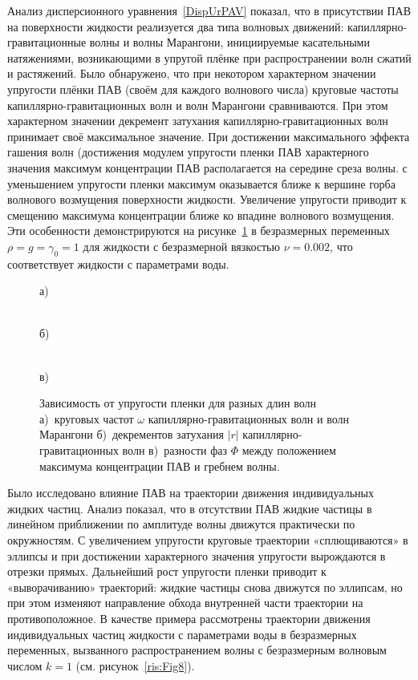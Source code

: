 Анализ дисперсионного уравнения~\eqref{DispUrPAV} показал, что в присутствии ПАВ на поверхности жидкости реализуется два типа волновых движений: капиллярно-гравитационные волны и волны Марангони, инициируемые касательными натяжениями, возникающими в упругой плёнке при распространении волн сжатий и растяжений. Было обнаружено, что при некотором характерном значении упругости плёнки ПАВ (своём для каждого волнового числа) круговые частоты капиллярно-гравитационных волн и волн Марангони сравниваются. При этом характерном значении декремент затухания капиллярно-гравитационных волн принимает своё максимальное значение. При достижении максимального эффекта гашения волн (достижения модулем упругости пленки ПАВ характерного значения максимум концентрации ПАВ располагается на середине среза волны. с уменьшением упругости пленки максимум оказывается ближе к вершине горба волнового возмущения поверхности жидкости. Увеличение упругости приводит к смещению максимума концентрации ближе ко впадине волнового возмущения. Эти особенности демонстрируются на рисунке~\ref{ris:Fig7} в безразмерных переменных $ \rho=g=\gamma_{0}=1 $ для жидкости с безразмерной вязкостью $ \nu=0.002 $, что соответствует жидкости с параметрами воды. 

\begin{figure}[ht]
	\begin{minipage}[h]{0.47\linewidth}
		 а) \\
	\end{minipage}
	\hfill
	\begin{minipage}[h]{0.47\linewidth}
		 \\б)
	\end{minipage}
	\vfill
		 \\в) \\
	\caption{Зависимость от упругости пленки для разных длин волн а)~круговых частот $ \omega $ капиллярно-гравитационных волн и волн Марангони б)~декрементов затухания $ |r| $ капиллярно-гравитационных волн в)~разности фаз $ \Phi $ между положением максимума концентрации ПАВ и гребнем волны.}
	\label{ris:Fig7}
\end{figure}

Было исследовано влияние ПАВ на траектории движения индивидуальных жидких частиц. Анализ показал, что в отсутствии ПАВ жидкие частицы в линейном приближении по амплитуде волны движутся практически по окружностям. С увеличением упругости круговые траектории «сплющиваются» в эллипсы и при достижении характерного значения упругости вырождаются в отрезки прямых. Дальнейший рост упругости пленки приводит к «выворачиванию» траекторий: жидкие частицы снова движутся по эллипсам, но при этом изменяют направление обхода внутренней части траектории на противоположное. В качестве примера рассмотрены траектории движения индивидуальных частиц жидкости с параметрами воды в безразмерных переменных, вызванного распространением волны с безразмерным волновым числом $ k=1 $ (см. рисунок~\ref{ris:Fig8}).

